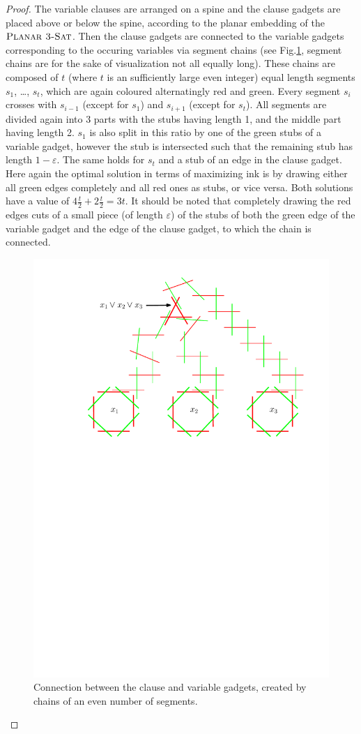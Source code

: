 \documentclass[a4paper,english,numberwithinsect]{eurocg18}
\newcommand{\ppsat}{\ensuremath{\textsc{Planar 3-Sat}}\xspace}
\begin{document}
\begin{proof}
The variable clauses are arranged on a spine and the clause gadgets are placed above or below the spine, according to the planar embedding of the \ppsat. Then the clause gadgets are connected to the variable gadgets corresponding to the occuring variables via segment chains (see Fig.\ref{fig:gadget_connection}, segment chains are for the sake of visualization not all equally long). These chains are composed of $t$ (where $t$ is an sufficiently large even integer) equal length segments $s_1$, \dots, $s_t$, which are again coloured alternatingly red and green. Every segment $s_i$ crosses with $s_{i-1}$ (except for $s_1$) and $s_{i+1}$ (except for $s_t$). All segments are divided again into 3 parts with the stubs having length 1, and the middle part having length 2. $s_1$ is also split in this ratio by one of the green stubs of a variable gadget, however the stub is intersected such that the remaining stub has length $1-\varepsilon$. The same holds for $s_t$ and a stub of an edge in the clause gadget. Here again the optimal solution in terms of maximizing ink is by drawing either all green edges completely and all red ones as stubs, or vice versa. Both solutions have a value of $4\frac{t}{2} + 2\frac{t}{2} = 3t$. It should be noted that completely drawing the red edges cuts of a small piece (of length $\varepsilon$) of the stubs of both the green edge of the variable gadget and the edge of the clause gadget, to which the chain is connected.

\begin{figure}
	\centering
	\includegraphics[width=.8\linewidth]{variable_clause_connection}
	\caption{Connection between the clause and variable gadgets, created by chains of an even number of segments.}
	\label{fig:gadget_connection}
\end{figure}


\end{proof}
\end{document}
